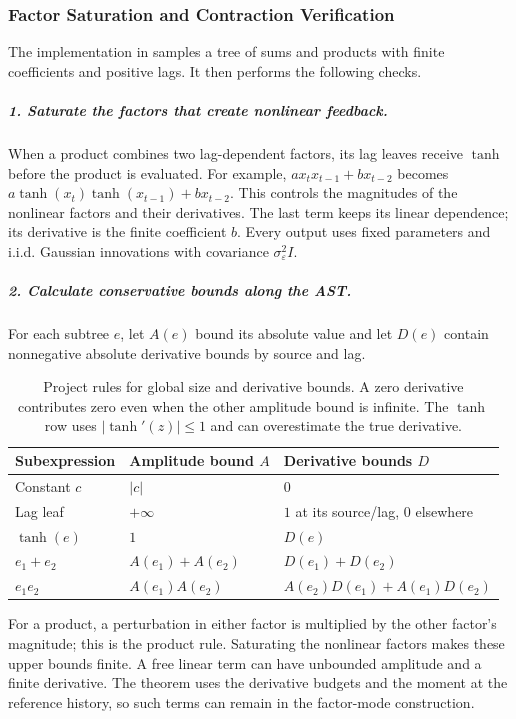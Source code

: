 \subsubsection{Factor Saturation and Contraction Verification}
The implementation in 
samples a tree of sums and products with finite coefficients and positive
lags. It then performs the following checks.

\subparagraph{1. Saturate the factors that create nonlinear feedback.}
When a product combines two lag-dependent factors, its lag leaves receive
$\tanh$ before the product is evaluated. For example,
$a x_t x_{t-1}+b x_{t-2}$ becomes
$a\tanh(x_t)\tanh(x_{t-1})+b x_{t-2}$.
This controls the magnitudes of the nonlinear factors and their derivatives.
The last term keeps its linear dependence; its derivative is the finite
coefficient $b$. Every output uses fixed parameters and i.i.d. Gaussian
innovations with covariance $\sigma_\varepsilon^2 I$.

\subparagraph{2. Calculate conservative bounds along the AST.}
For each subtree $e$, let $A(e)$ bound its absolute value and let $D(e)$
contain nonnegative absolute derivative bounds by source and lag.
\begin{table}[H]
\centering\small
\begin{tabular}{@{}lll@{}}
\toprule
Subexpression & Amplitude bound $A$ & Derivative bounds $D$\\
\midrule
Constant $c$ & $|c|$ & $0$\\
Lag leaf & $+\infty$ & $1$ at its source/lag, $0$ elsewhere\\
$\tanh(e)$ & $1$ & $D(e)$\\
$e_1+e_2$ & $A(e_1)+A(e_2)$ & $D(e_1)+D(e_2)$\\
$e_1e_2$ & $A(e_1)A(e_2)$ & $A(e_2)D(e_1)+A(e_1)D(e_2)$\\
\bottomrule
\end{tabular}
\caption{Project rules for global size and derivative bounds. A zero
derivative contributes zero even when the other amplitude bound is infinite.
The $\tanh$ row uses $|\tanh'(z)|\leq1$ and can overestimate the true derivative.}
\label{tab:ast-global-bounds}
\end{table}
For a product, a perturbation in either factor is multiplied by the other
factor's magnitude; this is the product rule. Saturating the nonlinear
factors makes these upper bounds finite. A free linear term can have
unbounded amplitude and a finite derivative. The theorem uses the
derivative budgets and the moment at the reference history, so such terms
can remain in the factor-mode construction.

